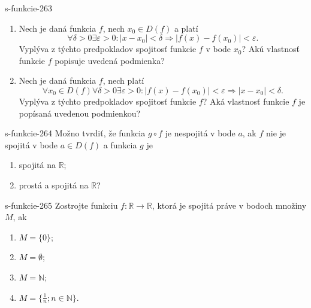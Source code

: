 
\begin{defproblem}{s-funkcie-263}
\begin{enumerate}
\item Nech je daná funkcia $f$, nech $x_0 \in D(f)$ a platí
  $$\forall \delta>0 \exists \varepsilon >0: |x-x_0|<\delta \Rightarrow |f(x)-f(x_0)|<\varepsilon.$$
  Vyplýva z týchto predpokladov spojitosť funkcie $f$ v bode $x_0$? Akú vlastnosť funkcie $f$ popisuje uvedená podmienka?
\item Nech je daná funkcia $f$, nech platí
$$\forall x_0 \in D(f) \forall \delta>0 \exists \varepsilon >0: |f(x)-f(x_0)|<\varepsilon \Rightarrow |x-x_0|<\delta.$$
Vyplýva z týchto predpokladov spojitosť funkcie $f$? Aká vlastnosť funkcie $f$ je popísaná uvedenou podmienkou?
\end{enumerate}
\end{defproblem}

\begin{defproblem}{s-funkcie-264}
Možno tvrdiť, že funkcia $g \circ f$ je nespojitá v bode $a$, ak $f$ nie je spojitá v bode $a \in D(f)$ a funkcia $g$ je
\begin{enumerate}
\item spojitá na $\mathbb{R}$;
\item prostá a spojitá na $\mathbb{R}$?
\end{enumerate}
\end{defproblem}

\begin{defproblem}{s-funkcie-265}
Zostrojte funkciu $f: \mathbb{R} \rightarrow \mathbb{R}$, ktorá je spojitá práve v bodoch množiny $M$, ak
\begin{enumerate}
\item $M=\{0\}$;
\item $M=\emptyset$;
\item $M=\mathbb{N}$;
\item $M=\{\frac{1}{n};n \in \mathbb{N}\}$.
\end{enumerate}
\end{defproblem}

